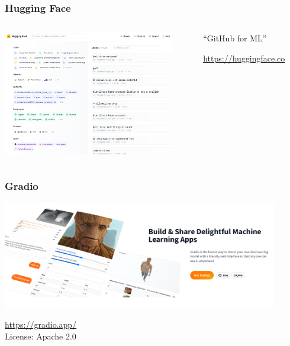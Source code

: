 \documentclass[17pt,aspectratio=169,hyperref={pdfusetitle,colorlinks,allcolors=olive}]{beamer}
\begin{document}
\begin{frame}[fragile]
  \frametitle{Hugging Face}

  \begin{columns}[T]
    \begin{column}{.58\textwidth}
        \includegraphics[width=7.5cm]{figs/hugging-face}
    \end{column}%
    \hfill%
    \begin{column}{.38\textwidth}
        ``GitHub for ML''

        \vspace{2cm}
        
        {\scriptsize
          \url{https://huggingface.co} \\
        }
    \end{column}%
  \end{columns}

\end{frame}

\begin{frame}[fragile]
  \frametitle{Gradio}

  \begin{center}
    \includegraphics[width=12cm]{figs/gradio}
  \end{center}

  \begin{flushright}
    {\small
      \url{https://gradio.app/} \\
      License: Apache 2.0 \\
    }
  \end{flushright}
\end{frame}
\end{document}
